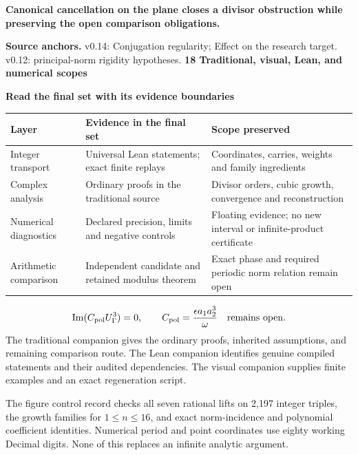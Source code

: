 \documentclass[11pt]{article}
\begin{document}
\begin{tcolorbox}[colback=pale,colframe=teal,boxrule=.4pt,arc=2pt,left=7pt,right=7pt,top=5pt,bottom=5pt]\small\bfseries Canonical cancellation on the plane closes a divisor obstruction while preserving the open comparison obligations.\end{tcolorbox}
\vfill{\footnotesize\color{navy}\textbf{Source anchors.} v0.14: Conjugation regularity; Effect on the research target. v0.12: principal-norm rigidity hypotheses.}
\clearpage
{\small\bfseries\color{teal}18 \textperiodcentered{} Traditional, visual, Lean, and numerical scopes}

{\LARGE\bfseries\color{navy}Read the final set with its evidence boundaries\par}
\vspace{3pt}
\vspace{5pt}\begin{center}\small\renewcommand{\arraystretch}{1.3}\begin{tabular}{@{}>{\raggedright\arraybackslash}p{.25\linewidth}>{\raggedright\arraybackslash}p{.33\linewidth}>{\raggedright\arraybackslash}p{.36\linewidth}@{}}\toprule
Layer & Evidence in the final set & Scope preserved\\
\midrule
Integer transport & Universal Lean statements; exact finite replays & Coordinates, carries, weights and family ingredients\\
Complex analysis & Ordinary proofs in the traditional source & Divisor orders, cubic growth, convergence and reconstruction\\
Numerical diagnostics & Declared precision, limits and negative controls & Floating evidence; no new interval or infinite-product certificate\\
Arithmetic comparison & Independent candidate and retained modulus theorem & Exact phase and required periodic norm relation remain open\\
\bottomrule\end{tabular}\end{center}
\[\operatorname{Im}(C_{\rm pol}U_\Gamma^3)=0,\qquad C_{\rm pol}=\frac{\epsilon a_1a_2^3}{\omega}\quad\text{remains open}.\]
The traditional companion gives the ordinary proofs, inherited assumptions, and remaining comparison route. The Lean companion identifies genuine compiled statements and their audited dependencies. The visual companion supplies finite examples and an exact regeneration script.

The figure control record checks all seven rational lifts on 2,197 integer triples, the growth families for $1\le n\le16$, and exact norm-incidence and polynomial coefficient identities. Numerical period and point coordinates use eighty working Decimal digits. None of this replaces an infinite analytic argument.
\end{document}
